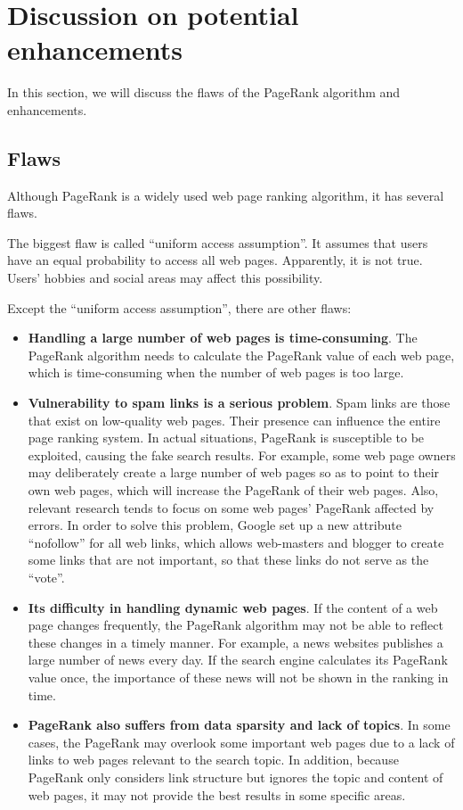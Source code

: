 \documentclass[lettersize,journal,12pt,conference]{IEEEtran}
\begin{document}
\section{Discussion on potential enhancements}

In this section, we will discuss the flaws of the PageRank algorithm and enhancements.

\subsection{Flaws}

Although PageRank is a widely used web page ranking algorithm, it has several flaws.

The biggest flaw is called ``uniform access assumption''. It assumes that users have an equal probability to access all web pages. Apparently, it is not true. Users' hobbies and social areas may affect this possibility.

Except the ``uniform access assumption'', there are other flaws:
\begin{itemize}
	\item \textbf{Handling a large number of web pages is time-consuming}. The PageRank algorithm needs to calculate the PageRank value of each web page, which is time-consuming when the number of web pages is too large.
	\item \textbf{Vulnerability to spam links is a serious problem}. Spam links are those that exist on low-quality web pages. Their presence can influence the entire page ranking system. In actual situations, PageRank is susceptible to be exploited, causing the fake search results. For example, some web page owners may deliberately create a large number of web pages so as to point to their own web pages, which will increase the PageRank of their web pages. Also, relevant research tends to focus on some web pages' PageRank affected by errors. In order to solve this problem, Google set up a new attribute ``nofollow'' for all web links, which allows web-masters and blogger to create some links that are not important, so that these links do not serve as the ``vote''.
	\item \textbf{Its difficulty in handling dynamic web pages}. If the content of a web page changes frequently, the PageRank algorithm may not be able to reflect these changes in a timely manner. For example, a news websites publishes a large number of news every day. If the search engine calculates its PageRank value once, the importance of these news will not be shown in the ranking in time.
	\item \textbf{PageRank also suffers from data sparsity and lack of topics}. In some cases, the PageRank may overlook some important web pages due to a lack of links to web pages relevant to the search topic. In addition, because PageRank only considers link structure but ignores the topic and content of web pages, it may not provide the best results in some specific areas.
\end{itemize}
\end{document}
